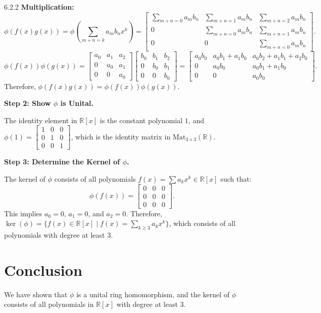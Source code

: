 \documentclass[12pt]{amsart}
\theoremstyle{definition}
\numberwithin{equation}{section}
\newcommand{\R}{\mathbb{R}}
\begin{document}
\begin{exercise}{6.2.2}
    \noindent \textbf{Multiplication:}
    \[
    \phi(f(x)g(x)) = \phi\left(\sum_{m+n=k} a_m b_n x^k\right) = \begin{bmatrix} \sum_{m+n=0} a_m b_n & \sum_{m+n=1} a_m b_n & \sum_{m+n=2} a_m b_n \\ 0 & \sum_{m+n=0} a_m b_n & \sum_{m+n=1} a_m b_n \\ 0 & 0 & \sum_{m+n=0} a_m b_n \end{bmatrix}.
    \]
    \[
    \phi(f(x))\phi(g(x)) = \begin{bmatrix} a_0 & a_1 & a_2 \\ 0 & a_0 & a_1 \\ 0 & 0 & a_0 \end{bmatrix} \begin{bmatrix} b_0 & b_1 & b_2 \\ 0 & b_0 & b_1 \\ 0 & 0 & b_0 \end{bmatrix} = \begin{bmatrix} a_0 b_0 & a_0 b_1 + a_1 b_0 & a_0 b_2 + a_1 b_1 + a_2 b_0 \\ 0 & a_0 b_0 & a_0 b_1 + a_1 b_0 \\ 0 & 0 & a_0 b_0 \end{bmatrix}.
    \]
    Therefore, \(\phi(f(x)g(x)) = \phi(f(x))\phi(g(x))\).

    \noindent \textbf{Step 2: Show \(\phi \) is Unital.}

    The identity element in \(\R[x]\) is the constant polynomial \(1\), and \(\phi(1) = \begin{bmatrix} 1 & 0 & 0 \\ 0 & 1 & 0 \\ 0 & 0 & 1 \end{bmatrix}\), which is the identity matrix in \(\text{Mat}_{3\times 3}(\R)\).

    \noindent \textbf{Step 3: Determine the Kernel of \(\phi \).}

    The kernel of \(\phi \) consists of all polynomials \(f(x) = \sum a_k x^k \in \R[x]\) such that:
    \[
    \phi(f(x)) = \begin{bmatrix} 0 & 0 & 0 \\ 0 & 0 & 0 \\ 0 & 0 & 0 \end{bmatrix}.
    \]
    This implies \(a_0 = 0\), \(a_1 = 0\), and \(a_2 = 0\). Therefore, \(\ker(\phi) = \{f(x) \in \R[x] \mid f(x) = \sum_{k \geq 3} a_k x^k\} \), which consists of all polynomials with degree at least 3.

    \section*{Conclusion}
    We have shown that \(\phi \) is a unital ring homomorphism, and the kernel of \(\phi \) consists of all polynomials in \(\R[x]\) with degree at least 3.

\end{exercise}
\end{document}
